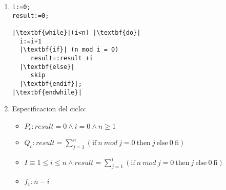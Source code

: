\documentclass{article}
\begin{document}
\noindent
\begin{enumerate}[label=\alph*)]
	\item 

\begin{lstlisting}
i:=0;
result:=0;

|\textbf{while}|(i<n) |\textbf{do}|
  i:=i+1
  |\textbf{if}| (n mod i = 0) 
     result=:result +i
  |\textbf{else}|
     skip
  |\textbf{endif}|;
|\textbf{endwhile}|
\end{lstlisting}
	\item
	
 Especificacion del ciclo:
	\begin{itemize}
		\item $P_c: result=0 \wedge i=0\wedge n\geq 1$
		\item $Q_c:result=\sum_{j=1}^{n}(\textrm{if}\ n\ mod\ j=0\ \textrm{then}\ j\ \textrm{else}\ 0\ \textrm{fi})$
		\item $I\equiv 1\leq i\leq n \wedge result=\sum_{j=1}^{i}(\textrm{if}\ n\ mod\ j=0\ \textrm{then}\ j\ \textrm{else}\ 0\ \textrm{fi})$
		\item $f_v:n-i$
	\end{itemize}
	

\end{enumerate}
\end{document}
